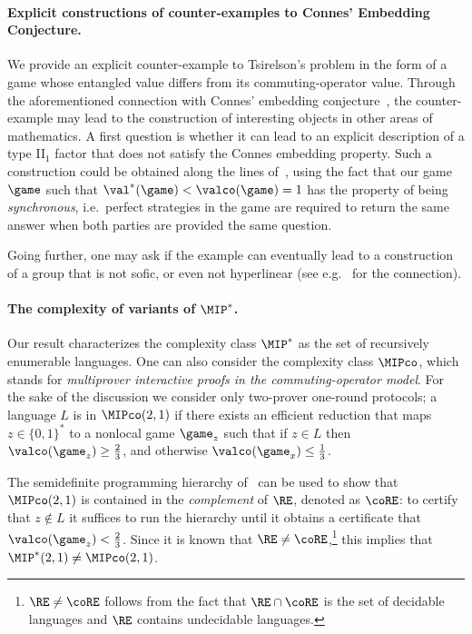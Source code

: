 \paragraph{Explicit constructions of counter-examples to Connes' Embedding Conjecture.} We provide an explicit counter-example to Tsirelson's problem in the form of a game whose entangled value differs from its commuting-operator value. Through the aforementioned connection with Connes' embedding conjecture~\cite{fritz2012tsirelson,junge2011connes,ozawa2013connes}, the counter-example may lead to the construction of interesting objects in other areas of mathematics. A first question is whether it can lead to an explicit description of a type II$_1$ factor that does not satisfy the Connes embedding property. Such a construction could be obtained along the lines of~\cite{kim2018synchronous}, using the fact that our game $\game$ such that $\val^*(\game) < \valco(\game) = 1$ has the property of being \emph{synchronous}, i.e.\ perfect strategies in the game are required to return the same answer when both parties are provided the same question. 

Going further, one may ask if the example can eventually lead to a construction of a group that is not sofic, or even not hyperlinear (see e.g.~\cite{capraro2015introduction} for the connection). 

\paragraph{The complexity of variants of $\MIP^*$.} Our result characterizes the complexity class $\MIP^*$ as the set of recursively enumerable languages. One can also consider the complexity class $\MIPco$, which stands for \emph{multiprover interactive proofs in the commuting-operator model}. For the sake of the discussion we consider only two-prover one-round protocols; a language $L$ is in $\MIPco(2,1)$ if there exists an efficient reduction that maps $z \in \{0,1\}^*$ to a nonlocal game $\game_z$ such that if $z \in L$ then $\valco(\game_z) \geq \frac{2}{3}$, and otherwise $\valco(\game_x) \leq \frac{1}{3}$.

The semidefinite programming hierarchy of~\cite{navascues2008convergent,doherty2008quantum} can be used to show that $\MIPco(2,1)$ is contained in the \emph{complement} of $\RE$, denoted as $\coRE$: to certify that $z \notin L$ it suffices to run the hierarchy until it obtains a certificate that $\valco(\game_z) < \frac{2}{3}$. Since it is known that $\RE \neq \coRE$,\footnote{$\RE \neq \coRE$ follows from the fact that $\RE \cap \coRE$ is the set of decidable languages and $\RE$ contains undecidable languages.} this implies that $\MIP^*(2,1) \neq \MIPco(2,1)$.

